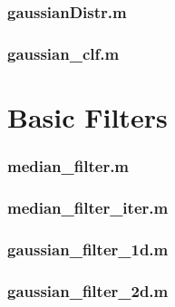 \subsubsection*{\hypertarget{gaussianDistr}{gaussianDistr.m}}


\subsubsection*{\hypertarget{gaussianclf}{gaussian\_clf.m}}



\section{Basic Filters}

\subsubsection*{\hypertarget{medianfilter}{median\_filter.m}}


\subsubsection*{\hypertarget{medianfiliter}{median\_filter\_iter.m}}


\subsubsection*{\hypertarget{gaussfilter}{gaussian\_filter\_1d.m}}


\subsubsection*{\hypertarget{gauss2d}{gaussian\_filter\_2d.m}}



